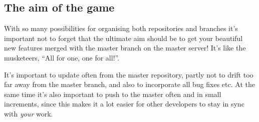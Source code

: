 \documentclass[a4paper,10pt]{article}
\begin{document}
\subsection{The aim of the game}
With so many possibilities for organising both repositories and branches it's
important not to forget that the ultimate aim should be to get your beautiful
new features merged with the master branch on the master server! It's like the
musketeers, ``All for one, one for all!''. 

It's important to update often from the master repository, partly not to drift
too far away from the master branch, and also to incorporate all bug fixes
etc. At the same time it's also important to push to the master often and in
small increments, since this makes it a lot easier for other developers to
stay in sync with \emph{your} work.
\end{document}
